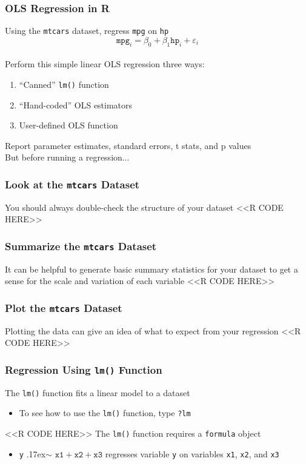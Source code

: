 \documentclass{beamer}
\begin{document}
\begin{frame}\frametitle{OLS Regression in R}
    Using the \texttt{mtcars} dataset, regress \texttt{mpg} on \texttt{hp}
    $$\texttt{mpg}_i = \beta_0 + \beta_1 \texttt{hp}_i + \varepsilon_i$$ \\
    \vspace{2ex}
    Perform this simple linear OLS regression three ways:
    \begin{enumerate}
        \item ``Canned'' \texttt{lm()} function
        \item ``Hand-coded'' OLS estimators
        \item User-defined OLS function 
    \end{enumerate}
    \vspace{2ex}
    Report parameter estimates, standard errors, t stats, and p values \\
    \vspace{2ex}
    But before running a regression...
\end{frame}

\begin{frame}[fragile]\frametitle{Look at the \texttt{mtcars} Dataset}
    You should always double-check the structure of your dataset
    <<R CODE HERE>>
\end{frame}

\begin{frame}[fragile]\frametitle{Summarize the \texttt{mtcars} Dataset}
    It can be helpful to generate basic summary statistics for your dataset to get a sense for the scale and variation of each variable
    <<R CODE HERE>>
\end{frame}

\begin{frame}[fragile]\frametitle{Plot the \texttt{mtcars} Dataset}
    Plotting the data can give an idea of what to expect from your regression
    <<R CODE HERE>>
\end{frame}

\begin{frame}[fragile]\frametitle{Regression Using \texttt{lm()} Function}
    The \texttt{lm()} function fits a linear model to a dataset
    \begin{itemize}
        \item To see how to use the \texttt{lm()} function, type \texttt{?lm}
    \end{itemize}
    <<R CODE HERE>>
    \vspace{2ex}
    The \texttt{lm()} function requires a \texttt{formula} object
    \begin{itemize}
        \item \texttt{y} {\raise.17ex\hbox{$\scriptstyle\mathtt{\sim}$}} $\mathtt{x1 + x2 + x3}$ regresses variable \texttt{y} on variables \texttt{x1}, \texttt{x2}, and \texttt{x3}
    \end{itemize}
\end{frame}
\end{document}
